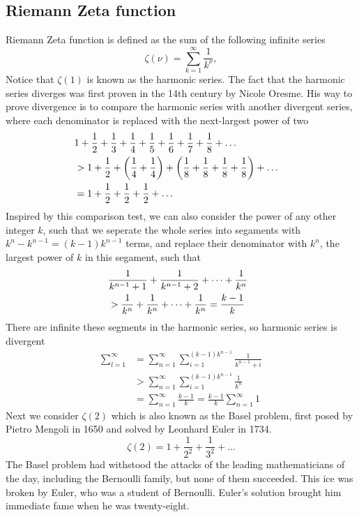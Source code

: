 \documentclass[10pt]{article}
\begin{document}
	\subsection{Riemann Zeta function}

	Riemann Zeta function is defined as the sum of the following infinite series
	\begin{equation}
		\zeta(\nu) = \sum_{k=1}^{\infty} \frac{1}{k^{\nu}},
	\end{equation}
	Notice that $\zeta(1)$ is known as the harmonic series. The fact that the harmonic series diverges was first proven in the 14th century by Nicole Oresme. His way to prove divergence is to compare the harmonic series with another divergent series, where each denominator is replaced with the next-largest power of two
	\begin{align*}
		\lefteqn{1 + \frac{1}{2} + \frac{1}{3} + \frac{1}{4} + \frac{1}{5} + \frac{1}{6} + \frac{1}{7} + \frac{1}{8} + \dots} \\
		&> 1 + \frac{1}{2} + \left(\frac{1}{4} + \frac{1}{4}\right) + \left(\frac{1}{8} + \frac{1}{8} + \frac{1}{8} + \frac{1}{8}\right) + \dots \\
		&= 1 + \frac{1}{2} + \frac{1}{2} + \frac{1}{2} + \dots
	\end{align*}
	Inspired by this comparison test, we can also consider the power of any other integer $k$, such that we seperate the whole series into segaments with $k^{n} - k^{n-1} = (k-1)k^{n-1}$ terms, and replace their denominator with $k^{n}$, the largest power of $k$ in this segament, such that
	\begin{align*}
		\lefteqn{\frac{1}{k^{n-1} +1} + \frac{1}{k^{n-1} + 2} + \dots + \frac{1}{k^n}}\\
		&> \frac{1}{k^n} + \frac{1}{k^n} + \dots + \frac{1}{k^n} = \frac{k-1}{k}
	\end{align*}
	There are infinite these segments in the harmonic series, so harmonic series is divergent
	\begin{align*}
		\sum_{l=1}^{\infty} &= \sum_{n=1}^{\infty} \sum_{i=1}^{(k-1)k^{n-1}} \frac{1}{k^{n-1} + i}\\
		&> \sum_{n=1}^{\infty} \sum_{i=1}^{(k-1)k^{n-1}} \frac{1}{k^n} \\
		&= \sum_{n=1}^{\infty} \frac{k-1}{k} = \frac{k-1}{k} \sum_{n=1}^{\infty} 1
	\end{align*}
	Next we consider $\zeta(2)$ which is also known as the Basel problem, first posed by Pietro Mengoli in 1650 and solved by Leonhard Euler in 1734.
	\begin{equation}
		\zeta(2) = 1 + \frac{1}{2^2} + \frac{1}{3^2} + \dots
	\end{equation}
	The Basel problem had withstood the attacks of the leading mathematicians of the day, including the Bernoulli family, but none of them succeeded. This ice was broken by Euler, who was a student of Bernoulli. Euler's solution brought him immediate fame when he was twenty-eight.
\end{document}

